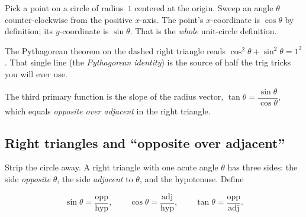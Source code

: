 \documentclass{article}
\begin{document}
Pick a point on a circle of radius~$1$ centered at the origin. Sweep an angle
$\theta$ counter-clockwise from the positive $x$-axis. The point's
$x$-coordinate is $\cos\theta$ by definition; its $y$-coordinate is
$\sin\theta$. That is the \emph{whole} unit-circle definition.

\begin{center}
\end{center}

The Pythagorean theorem on the dashed right triangle reads
$\cos^2\theta + \sin^2\theta = 1^2$. That single line (the \emph{Pythagorean
identity}) is the source of half the trig tricks you will ever use.

The third primary function is the slope of the radius vector,
\(
  \tan\theta = \dfrac{\sin\theta}{\cos\theta},
\)
which equals \emph{opposite over adjacent} in the right triangle.

\subsection{Right triangles and ``opposite over adjacent''}

Strip the circle away. A right triangle with one acute angle $\theta$ has three
sides: the side \emph{opposite} $\theta$, the side \emph{adjacent} to $\theta$,
and the hypotenuse. Define

\[
  \sin\theta = \frac{\text{opp}}{\text{hyp}}, \qquad
  \cos\theta = \frac{\text{adj}}{\text{hyp}}, \qquad
  \tan\theta = \frac{\text{opp}}{\text{adj}}.
\]

\begin{center}
\end{center}
\end{document}
